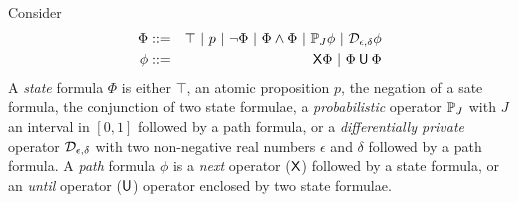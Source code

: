 
Consider
\begin{eqnarray*}
  \Phi & ::= & \top \ |\ p \ |\ \neg \Phi \ |\ \Phi \wedge \Phi \ |\ 
               \PJ{J} \phi \ |\ \dpriv{\epsilon}{\delta} \phi\\
  \phi & ::= & \X \Phi \ |\ \Phi \until \Phi
\end{eqnarray*}
A \emph{state} formula $\Phi$ is either $\top$, an atomic proposition
$p$, the negation of a sate formula, the conjunction of two state
formulae, a \emph{probabilistic} operator $\mathbb{P}_{J}$ with $J$
an interval in $[0, 1]$ followed by a path formula, or a
\emph{differentially private} operator $\mathcal{D}_{{\epsilon}, {\delta}}$
 with two non-negative real numbers $\epsilon$ and $\delta$ followed
 by a path formula. A 
\emph{path} formula $\phi$ is a \emph{next} operator ($\mathsf{X}$)
followed by a state formula, or an \emph{until} operator
($\mathbin{\mathsf{U}}$) operator enclosed by two state formulae. 

